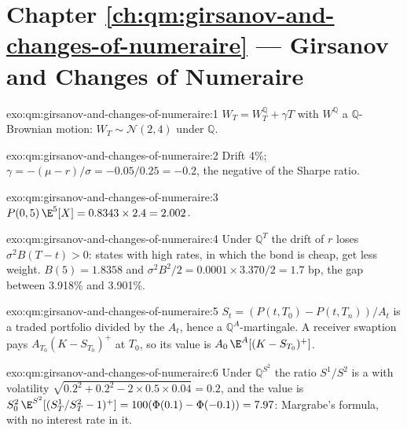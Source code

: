 \section*{Chapter \ref{ch:qm:girsanov-and-changes-of-numeraire} --- Girsanov and Changes of Numeraire}

\begin{solution}{exo:qm:girsanov-and-changes-of-numeraire:1}
$W_T = W^{\mathbb Q}_T + \gamma T$ with $W^{\mathbb Q}$ a $\mathbb Q$-Brownian motion: $W_T \sim \mathcal N(2, 4)$ under $\mathbb Q$.
\end{solution}

\begin{solution}{exo:qm:girsanov-and-changes-of-numeraire:2}
Drift 4\%; $\gamma = -(\mu - r)/\sigma = -0.05/0.25 = -0.2$, the negative of the Sharpe ratio.
\end{solution}

\begin{solution}{exo:qm:girsanov-and-changes-of-numeraire:3}
$P(0,5)\,\E^5[X] = 0.8343 \times 2.4 = 2.002$.
\end{solution}

\begin{solution}{exo:qm:girsanov-and-changes-of-numeraire:4}
Under $\mathbb Q^T$ the drift of $r$ loses $\sigma^2B(T - t) > 0$: states with high rates, in which the bond
is cheap, get less weight. $B(5) = 1.8358$ and $\sigma^2B^2/2 = 0.0001 \times 3.370/2 = 1.7$ bp, the gap between
3.918\% and 3.901\%.
\end{solution}

\begin{solution}{exo:qm:girsanov-and-changes-of-numeraire:5}
$S_t = (P(t,T_0) - P(t,T_n))/A_t$ is a traded portfolio divided by the  $A_t$, hence a
$\mathbb Q^A$-martingale. A receiver swaption pays $A_{T_0}(K - S_{T_0})^+$ at $T_0$, so its value is $A_0\,\E^A[(K -
S_{T_0})^+]$.
\end{solution}

\begin{solution}{exo:qm:girsanov-and-changes-of-numeraire:6}
Under $\mathbb Q^{S^2}$ the ratio $S^1/S^2$ is a  with volatility $\sqrt{0.2^2 + 0.2^2 - 2 \times 0.5
\times 0.04} = 0.2$, and the value is $S^2_0\,\E^{S^2}[(S^1_T/S^2_T - 1)^+] = 100(\Phi(0.1) - \Phi(-0.1)) = 7.97$:
Margrabe's formula, with no interest rate in it.
\end{solution}

